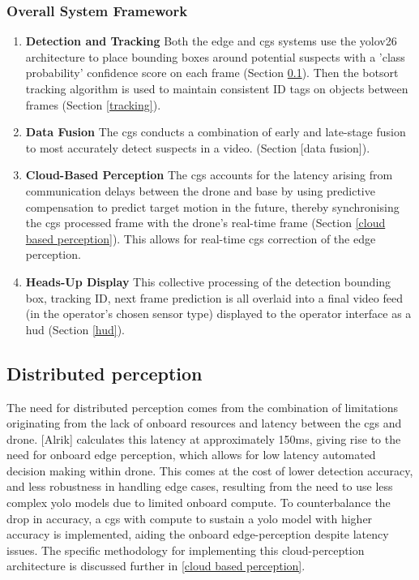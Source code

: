 \documentclass{report_template_oxford}
\begin{document}
\subsubsection{Overall System Framework}
\begin{enumerate}
    \item \textbf{Detection and Tracking} \quad Both the edge and \gls{cgs} systems use the \gls{yolo}v26 architecture to place bounding boxes around potential suspects with a 'class probability' confidence score on each frame (Section \ref{distributed}). Then the \gls{botsort} tracking algorithm is used to maintain consistent ID tags on objects between frames (Section \ref{tracking}). 
    \item \textbf{Data Fusion} \quad The \gls{cgs} conducts a combination of early and late-stage fusion to most accurately detect suspects in a video. (Section [data fusion]). 
    \item \textbf{Cloud-Based Perception} \quad The \gls{cgs} accounts for the latency arising from communication delays between the drone and base by using predictive compensation to predict target motion in the future, thereby synchronising the \gls{cgs} processed frame with the drone's real-time frame (Section \ref{cloud based perception}). This allows for real-time \gls{cgs} correction of the edge perception. 
    \item \textbf{Heads-Up Display} \quad This collective processing of the detection bounding box, tracking ID, next frame prediction is all overlaid into a final video feed (in the operator's chosen sensor type)  displayed to the operator interface as a \gls{hud} (Section \ref{hud}). 
\end{enumerate}



\subsection{Distributed perception} \label{distributed}
The need for distributed perception comes from the combination of limitations originating from the lack of onboard resources and latency between the \gls{cgs} and drone. [Alrik] calculates this latency at approximately 150ms, giving rise to the need for onboard edge perception, which allows for low latency automated decision making within drone. This comes at the cost of lower detection accuracy, and less robustness in handling edge cases, resulting from the need to use less complex \gls{yolo} models due to limited onboard compute. To counterbalance the drop in accuracy, a \gls{cgs} with compute to sustain a \gls{yolo} model with higher accuracy is implemented, aiding the onboard edge-perception despite latency issues. The specific methodology for implementing this cloud-perception architecture is discussed further in \ref{cloud based perception}. 
\end{document}
